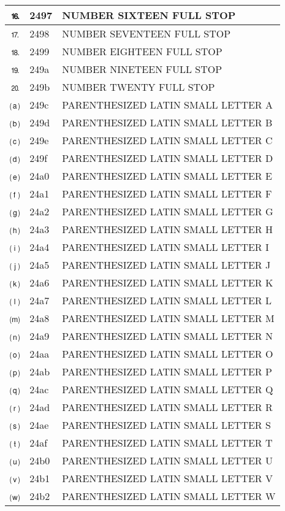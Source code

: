 \documentclass[12pt,letterpaper,openany]{book}
\begin{document}
\begin{center}
\begin{supertabular}{|m{0.25in}|m{0.5in}|m{4in}|}
			⒗ & 2497 & NUMBER SIXTEEN FULL STOP\\\hline
			⒘ & 2498 & NUMBER SEVENTEEN FULL STOP\\\hline
			⒙ & 2499 & NUMBER EIGHTEEN FULL STOP\\\hline
			⒚ & 249a & NUMBER NINETEEN FULL STOP\\\hline
			⒛ & 249b & NUMBER TWENTY FULL STOP\\\hline
			⒜ & 249c & PARENTHESIZED LATIN SMALL LETTER A\\\hline
			⒝ & 249d & PARENTHESIZED LATIN SMALL LETTER B\\\hline
			⒞ & 249e & PARENTHESIZED LATIN SMALL LETTER C\\\hline
			⒟ & 249f & PARENTHESIZED LATIN SMALL LETTER D\\\hline
			⒠ & 24a0 & PARENTHESIZED LATIN SMALL LETTER E\\\hline
			⒡ & 24a1 & PARENTHESIZED LATIN SMALL LETTER F\\\hline
			⒢ & 24a2 & PARENTHESIZED LATIN SMALL LETTER G\\\hline
			⒣ & 24a3 & PARENTHESIZED LATIN SMALL LETTER H\\\hline
			⒤ & 24a4 & PARENTHESIZED LATIN SMALL LETTER I\\\hline
			⒥ & 24a5 & PARENTHESIZED LATIN SMALL LETTER J\\\hline
			⒦ & 24a6 & PARENTHESIZED LATIN SMALL LETTER K\\\hline
			⒧ & 24a7 & PARENTHESIZED LATIN SMALL LETTER L\\\hline
			⒨ & 24a8 & PARENTHESIZED LATIN SMALL LETTER M\\\hline
			⒩ & 24a9 & PARENTHESIZED LATIN SMALL LETTER N\\\hline
			⒪ & 24aa & PARENTHESIZED LATIN SMALL LETTER O\\\hline
			⒫ & 24ab & PARENTHESIZED LATIN SMALL LETTER P\\\hline
			⒬ & 24ac & PARENTHESIZED LATIN SMALL LETTER Q\\\hline
			⒭ & 24ad & PARENTHESIZED LATIN SMALL LETTER R\\\hline
			⒮ & 24ae & PARENTHESIZED LATIN SMALL LETTER S\\\hline
			⒯ & 24af & PARENTHESIZED LATIN SMALL LETTER T\\\hline
			⒰ & 24b0 & PARENTHESIZED LATIN SMALL LETTER U\\\hline
			⒱ & 24b1 & PARENTHESIZED LATIN SMALL LETTER V\\\hline
			⒲ & 24b2 & PARENTHESIZED LATIN SMALL LETTER W\\\hline

\end{supertabular}
\end{center}
\end{document}
